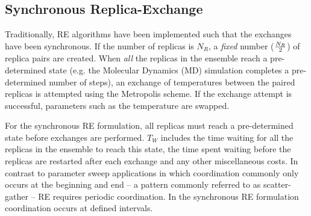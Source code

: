 \documentclass{rspublic}
\newcommand{\alnote}[1]{ {\textcolor{blue} { ***andre: #1 }}}
\newcommand{\athotanote}[1]{ {\textcolor{green} { ***athota: #1 }}}
\newcommand{\alnote}[1]{}
\newcommand{\athotanote}[1]{}
\begin{document}





\subsection{Synchronous Replica-Exchange}

Traditionally, RE algorithms have been implemented such that the
exchanges have been synchronous.  If the number of replicas is
${N_R}$, a {\it fixed} number (${N_R \over 2}$) of replica pairs are created. When \emph{all} the replicas in the ensemble
reach a pre-determined state (e.g. the Molecular Dynamics (MD)
simulation completes a pre-determined number of steps), an exchange of
temperatures between the paired replicas is attempted using the
Metropolis scheme.  If the exchange attempt is successful, parameters
such as the temperature are swapped.


For the synchronous RE formulation, all replicas must reach a
pre-determined state before exchanges are performed.
$T_W$ includes the time waiting for all the replicas in the ensemble
to reach this state, the time spent waiting before the replicas are
restarted after each exchange and any other miscellaneous costs.  In
contrast to parameter sweep applications in which coordination
commonly only occurs at the beginning and end -- a pattern commonly
referred to as scatter-gather -- RE requires periodic coordination. In
the synchronous RE formulation coordination occurs at defined
intervals.
\end{document}
